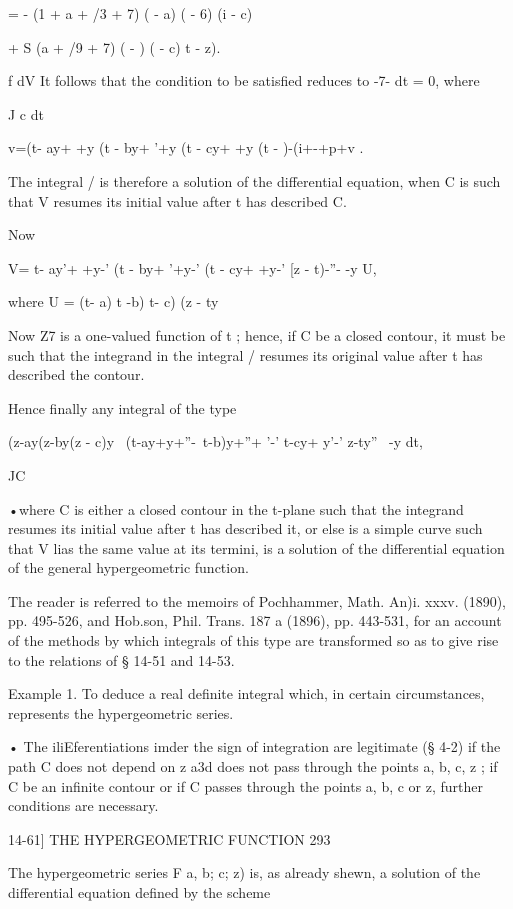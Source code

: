 = - (1 + a + /3 + 7) ( - a) ( - 6) (i - c)

+ S (a + /9 + 7) ( - ) ( - c) t - z).

f dV It follows that the condition to be satisfied reduces to -7- dt =
0, where

J c dt

v=(t- ay+ +y (t - by+ '+y (t - cy+ +y (t - )-(i+-+p+v .

The integral / is therefore a solution of the differential equation,
when C is such that V resumes its initial value after t has described
C.

Now

V= t- ay'+ +y-' (t - by+ '+y-' (t - cy+ +y-' [z - t)-''- -y U,

where U = (t- a) t -b) t- c) (z - ty\

Now Z7 is a one-valued function of t ; hence, if C be a closed
contour, it must be such that the integrand in the integral / resumes
its original value after t has described the contour.

Hence finally any integral of the type

(z-ay(z-by(z - c)y \ (t-ay+y+''-\ t-b)y+''+ '-' t-cy+ y'-' z-ty''~ -y
dt,

JC

•where C is either a closed contour in the t-plane such that the
integrand resumes its initial value after t has described it, or else
is a simple curve such that V lias the same value at its termini, is a
solution of the differential equation of the general hypergeometric
function.

The reader is referred to the memoirs of Pochhammer, Math. An)i. xxxv.
(1890), pp. 495-526, and Hob.son, Phil. Trans. 187 a (1896), pp.
443-531, for an account of the methods by which integrals of this type
are transformed so as to give rise to the relations of § 14-51 and
14-53.

Example 1. To deduce a real definite integral which, in certain
circumstances, represents the hypergeometric series.

• The iliEferentiations imder the sign of integration are legitimate
(§ 4-2) if the path C does not depend on z a3d does not pass through
the points a, b, c, z ; if C be an infinite contour or if C passes
through the points a, b, c or z, further conditions are necessary.



14-61] THE HYPERGEOMETRIC FUNCTION 293

The hypergeometric series F a, b; c; z) is, as already shewn, a
solution of the differential equation defined by the scheme

